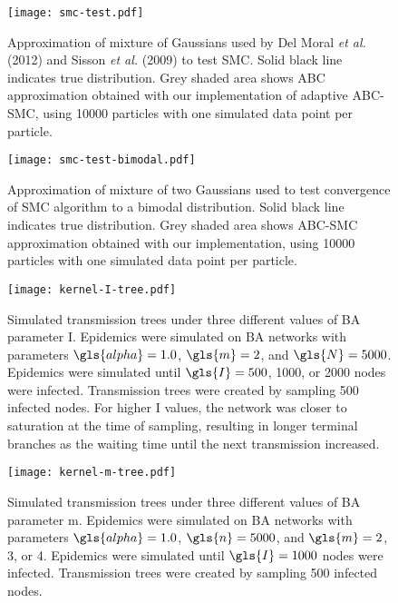 \begin{figure}[ht]
  \centering
  \texttt{[image: smc-test.pdf]}
  \caption[
      Approximation of mixture of Gaussians used by Del Moral \textit{et al.}
      (2012) and Sisson \textit{et al.} (2009) to test adaptive
      \gls{ABC}-\gls{SMC}.
    ]{
      Approximation of mixture of Gaussians used by Del Moral \textit{et al.}
      (2012) and Sisson \textit{et al.} (2009) to test SMC. Solid black line
      indicates true distribution. Grey shaded area shows \gls{ABC}
      approximation obtained with our implementation of adaptive
      \gls{ABC}-\gls{SMC}, using 10000 particles with one simulated data point
      per particle.
    }
  \label{fig:smctest}
\end{figure}

\begin{figure}[ht]
  \centering
  \texttt{[image: smc-test-bimodal.pdf]}
  \caption[
    Approximation of mixture of two Gaussians used to test convergence of
    adaptive \gls{ABC}-\gls{SMC} algorithm to a bimodal distribution.
  ]{
    Approximation of mixture of two Gaussians used to test convergence of SMC
    algorithm to a bimodal distribution. Solid black line indicates true
    distribution. Grey shaded area shows \gls{ABC}-\gls{SMC} approximation
    obtained with our implementation, using 10000 particles with one simulated
    data point per particle.
  }
  \label{fig:smctest2}
\end{figure}

\begin{figure}[ht]
    \centering
    \texttt{[image: kernel-I-tree.pdf]}
    \caption[
        Simulated transmission trees under three different values of \gls{BA}
        parameter \gls{I}
    ]{
        Simulated transmission trees under three different values of \gls{BA}
        parameter \gls{I}. Epidemics were simulated on \gls{BA} networks with
        parameters $\gls{alpha} = 1.0$, $\gls{m} = 2$, and $\gls{N} = 5000$.
        Epidemics were simulated until $\gls{I} = 500$, 1000, or 2000 nodes
        were infected. Transmission trees were created by sampling 500 infected
        nodes. For higher \gls{I} values, the network was closer to saturation
        at the time of sampling, resulting in longer terminal branches as the
        waiting time until the next transmission increased.
    }
    \label{fig:Itrees}
\end{figure}

\begin{figure}[ht]
    \centering
    \texttt{[image: kernel-m-tree.pdf]}
    \caption[
        Simulated transmission trees under three different values of \gls{BA}
        parameter \gls{m}
    ]{
        Simulated transmission trees under three different values of \gls{BA}
        parameter \gls{m}. Epidemics were simulated on \gls{BA} networks with
        parameters $\gls{alpha} = 1.0$, $\gls{n} = 5000$, and $\gls{m} = 2$, 3,
        or 4. Epidemics were simulated until $\gls{I} = 1000$ nodes were
        infected. Transmission trees were created by sampling 500 infected
        nodes.
    }
    \label{fig:mtrees}
\end{figure}

